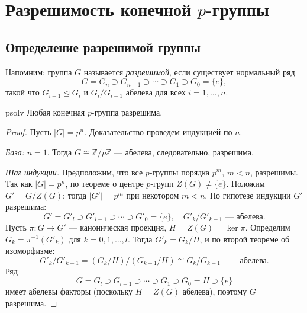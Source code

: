 \section{Разрешимость конечной $p$-группы}

\subsection*{Определение разрешимой группы}
Напомним: группа $G$ называется \textit{разрешимой}, если существует нормальный ряд
\[
G = G_n \supset G_{n-1} \supset \cdots \supset G_1 \supset G_0 = \{e\},
\]
такой что $G_{i-1} \trianglelefteq G_i$ и $G_i/G_{i-1}$ абелева для всех $i = 1, \ldots, n$.

\begin{Theorem}{}{psolv}
	Любая конечная $p$-группа разрешима.
\end{Theorem}

\begin{proof}
	Пусть $|G| = p^n$. Доказательство проведем индукцией по $n$.

	\textit{База:} $n = 1$.
	Тогда $G \cong \mathbb{Z}/p\mathbb{Z}$ — абелева, следовательно, разрешима.

	\textit{Шаг индукции.} Предположим, что все $p$-группы порядка $p^m$, $m < n$, разрешимы.
	Так как $|G| = p^n$, по теореме о центре $p$-групп $Z(G) \neq \{e\}$.
	Положим $G' = G/Z(G)$; тогда $|G'| = p^m$ при некотором $m < n$.
	По гипотезе индукции $G'$ разрешима:
	\[
	G' = G'_l \supset G'_{l-1} \supset \cdots \supset G'_0 = \{e\}, \quad G'_k/G'_{k-1} \text{ — абелева.}
	\] 
	Пусть $\pi \colon G \to G'$ — каноническая проекция, $H = Z(G) = \ker\pi$.
	Определим $G_k = \pi^{-1}(G'_k)$ для $k = 0, 1, \ldots, l$.
	Тогда $G'_k = G_k/H$, и по второй теореме об изоморфизме:
	\[
	G'_k/G'_{k-1} = (G_k/H)\big/(G_{k-1}/H) \cong G_k/G_{k-1} \quad \text{— абелева.}
	\] 
	Ряд
	\[
	G = G_l \supset G_{l-1} \supset \cdots \supset G_1 \supset G_0 = H \supset \{e\}
	\]
	имеет абелевы факторы (поскольку $H = Z(G)$ абелева), поэтому $G$ разрешима.
\end{proof}
